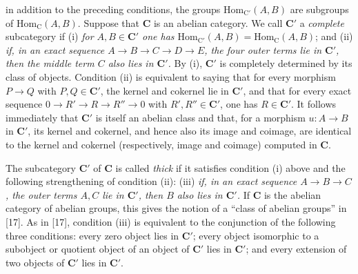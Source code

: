 
\noindent in addition to the preceding conditions, the groups
$\mathrm{Hom}_{\mathrm{C}'}(A,B)$ are subgroups of $\mathrm{Hom}_{\mathrm{C}}(A,B)$.
Suppose that $\mathbf{C}$ is an abelian category. We call $\mathbf{C}'$ a \textit{complete}
subcategory if (i) \textit{for $A,B\in \mathbf{C}'$ one has
$\mathrm{Hom}_{\mathrm{C}'}(A,B)=\mathrm{Hom}_{\mathrm{C}}(A,B)$}; and (ii) \textit{if, in an
exact sequence $A\to B\to C\to
D\to E$, the four outer terms lie in $\mathbf{C}'$, then the middle term
$C$ also lies in $\mathbf{C}'$.} By (i), $\mathbf{C}'$ is completely determined by its class of
objects. Condition (ii) is equivalent to saying that for every morphism
$P\to Q$ with $P,Q\in \mathbf{C}'$, the kernel and cokernel lie in $\mathbf{C}'$,
and that for every exact sequence
$0\to R'\to R\to R''\to 0$
with $R',R''\in \mathbf{C}'$, one has $R\in \mathbf{C}'$. It follows immediately that $\mathbf{C}'$ is
itself an abelian class and that, for a morphism $u:A\to B$ in
$\mathbf{C}'$, its kernel and cokernel, and hence also its image and coimage, are
identical to the kernel and cokernel (respectively, image and coimage) computed in $\mathbf{C}$.

The subcategory $\mathbf{C}'$ of $\mathbf{C}$ is called \textit{thick} if it satisfies condition
(i) above and the following strengthening of condition (ii): (iii)
\textit{if, in an exact sequence $A\to B\to C$, the
outer terms $A,C$ lie in $\mathbf{C}'$, then $B$ also lies in $\mathbf{C}'$.} If $\mathbf{C}$ is the
abelian category of abelian groups, this gives the notion of a ``class of
abelian groups'' in [17]. As in [17], condition (iii) is equivalent to the
conjunction of the following three conditions: every zero object lies in
$\mathbf{C}'$; every object isomorphic to a subobject or quotient object of an object
of $\mathbf{C}'$ lies in $\mathbf{C}'$; and every extension of two objects of $\mathbf{C}'$ lies in
$\mathbf{C}'$.

